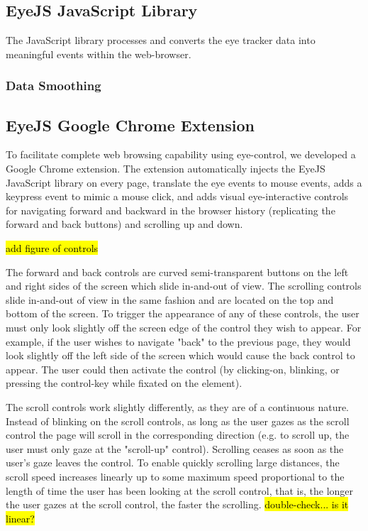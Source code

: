 \documentclass{sigchi}
\begin{document}
\subsection{EyeJS JavaScript Library}
The JavaScript library processes and converts the eye tracker data
into meaningful events within the web-browser.

\subsubsection{Data Smoothing}

\subsubsection{}


\subsection{EyeJS Google Chrome Extension}
To facilitate complete web browsing capability using eye-control, we 
developed a Google Chrome extension. The extension automatically injects
the EyeJS JavaScript library on every page, translate the eye events to 
mouse events, adds a keypress event to mimic a mouse click, and adds 
visual eye-interactive controls for navigating forward and backward in
the browser history (replicating the forward and back buttons) and 
scrolling up and down.

\hl{add figure of controls}

The forward and back controls are curved semi-transparent buttons on 
the left and right sides of the screen which slide in-and-out of view.
The scrolling controls slide in-and-out of view in the same fashion and
are located on the top and bottom of the screen. To trigger the 
appearance of any of these controls, the user must only look slightly 
off the screen edge of the control they wish to appear. For example, 
if the user wishes to navigate "back" to the previous page, they would
look slightly off the left side of the screen which would cause the 
back control to appear. The user could then activate the control (by
clicking-on, blinking, or pressing the control-key while fixated 
on the element).

The scroll controls work slightly differently, as they are of a 
continuous nature. Instead of blinking on the scroll controls, as long
as the user gazes as the scroll control the page will scroll in the
corresponding direction (e.g. to scroll up, the user must only gaze
at the "scroll-up" control). Scrolling ceases as soon as the user's 
gaze leaves the control. To enable quickly scrolling large distances,
the scroll speed increases linearly up to some maximum speed 
proportional to the length of time the user has been looking at the 
scroll control, that is, the longer the user gazes at the scroll
control, the faster the scrolling. \hl{double-check... is it linear?}
\end{document}
